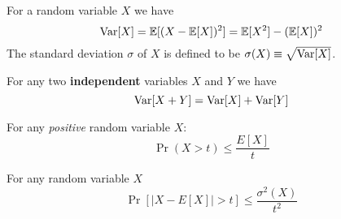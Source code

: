 \begin{definition}[Variance]%
For a random variable $X$ we have 
\begin{equation}
{\operatorname{Var}}[X] = {\mathbb E}[(X - {\mathbb E}[X])^2] = {\mathbb E}[X^2] - ({\mathbb E}[X])^2
\end{equation}
The standard deviation $\sigma$ of $X$ is defined to be $\sigma(X) \equiv \sqrt{{\operatorname{Var}}[X]}$.
\end{definition}

\begin{definition}%
For any two {\bf independent} variables $X$ and $Y$ we have 
\begin{equation}
{\operatorname{Var}}[X + Y] = {\operatorname{Var}}[X] + {\operatorname{Var}}[Y]
\end{equation}
\end{definition}

\begin{fact}%
For any {\it positive} random variable $X$:
\begin{equation}
\Pr(X > t) \le \frac{E[X]}{t}
\end{equation}
\end{fact}

\begin{fact}%
For any random variable $X$
\begin{equation}
\Pr[|X-E[X]| > t] \le \frac{\sigma^2(X)}{t^2}
\end{equation}
\end{fact}








